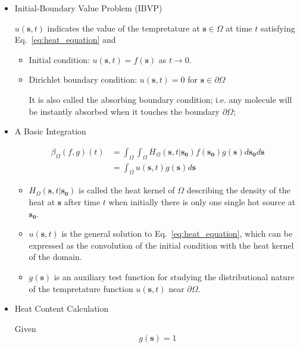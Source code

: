    \begin{itemize}
      \item Initial-Boundary Value Problem (IBVP)
        \par
        $u(\bm{s}, t)$ indicates the value of the tempretature at $\bm{s} \in \Omega$ at time $t$ satisfying Eq.~\ref{eq:heat_equation} and
        \begin{itemize}
          \item Initial condition: $u(\bm{s}, t) = f(\bm{s})$ as $t \rightarrow 0$.
          \item Dirichlet boundary condition: $u(\bm{s}, t)=0$ for $\bm{s} \in \partial \Omega$
            \par
            It is also called the absorbing boundary condition; i.e. any molecule will be instantly absorbed when it touches the boundary $\partial \Omega$;
        \end{itemize}

      \item A Basic Integration

        \par
          \begin{align}
            \beta_{\Omega}(f, g)(t) &= \int_{\Omega} \int_{\Omega} H_{\Omega}(\bm{s}, t | \bm{s_0}) f(\bm{s_0}) g(\bm{s}) d\bm{s_0} d\bm{s} \label{eq:integral_full} \\
            &= \int_{\Omega} u(\bm{s}, t) g(\bm{s}) d\bm{s} \label{eq:integral_convol}
          \end{align}


        \begin{itemize}
           \item $H_{\Omega}(\bm{s}, t | \bm{s_0})$ is called the heat kernel of $\Omega$ describing the density of the heat at $\bm{s}$ after time $t$ when initially there is only one single hot source at $\bm{s_0}$.
           \item $u(\bm{s}, t)$ is the general solution to Eq.~\ref{eq:heat_equation}, which can be expressed as the convolution of the initial condition with the heat kernel of the domain.
           \item $g(\bm{s})$ is an auxiliary test function for studying the distributional nature of the tempretature function $u(\bm{s}, t)$ near $\partial \Omega$.
        \end{itemize}


      \item Heat Content Calculation

        \par
       Given 
       \begin{equation} \label{eq:g}
         g(\bm{s}) = 1  
       \end{equation}


\end{itemize}
